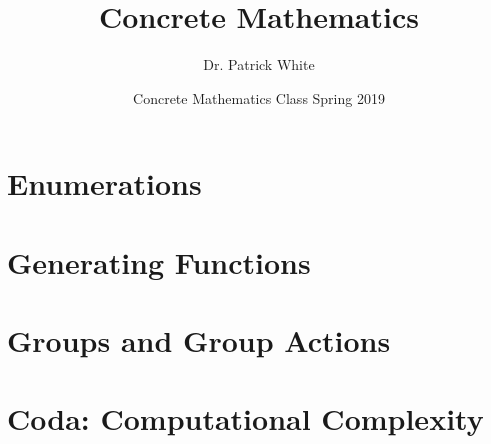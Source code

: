 \documentclass[12pt, titlepage]{article}
\title{Concrete Mathematics}
\author{Dr. Patrick White}
\date{Concrete Mathematics Class Spring 2019} %
\begin{document}
\maketitle

\tableofcontents

\newpage 



\newpage



\newpage 

\part{Enumerations}

% 







 







\newpage 

\part{Generating Functions}
% 

\part{Groups and Group Actions}

\part{Coda: Computational Complexity}
\end{document}
